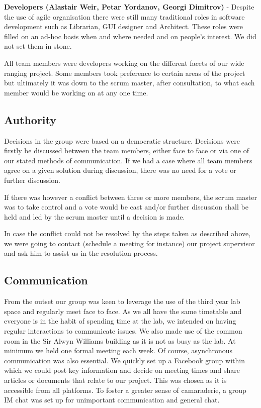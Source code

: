 \documentclass{l3proj}
\begin{document}
{\bf Developers (Alastair Weir, Petar Yordanov, Georgi Dimitrov)} - Despite the use of agile organisation there were still many traditional roles in software development such as Librarian, GUI designer and Architect.  These roles were filled on an ad-hoc basis when and where needed and on people’s interest. We did not set them in stone.

All team members were developers working on the different facets of our wide ranging project. Some members took preference to certain areas of the project but ultimately it was down to the scrum master, after consultation, to what each member would be working on at any one time.

\subsection{Authority}Decisions in the group were based on a democratic structure. Decisions were firstly be discussed between the team members, either face to face or via one of our stated methods of communication. If we had a case where all team members agree on a given solution during discussion, there was no need for a vote or further discussion.

If there was however a conflict between three or more members, the scrum master was to take control and a vote would be cast and/or further discussion shall be held and led by the scrum master until a decision is made.

In case the conflict could not be resolved by the steps taken as described above, we were going to contact (schedule a meeting for instance) our project supervisor and ask him to assist us in the resolution process.

\subsection{Communication}From the outset our group was keen to leverage the use of the third year lab space and regularly meet face to face. As we all have the same timetable and everyone is in the habit of spending time at the lab, we intended on having regular interactions to communicate issues. We also made use of the common room in the Sir Alwyn Williams building as it is not as busy as the lab. At minimum we held one formal meeting each week. Of course, asynchronous communication was also essential. We quickly set up a Facebook group within which we could post key information and decide on meeting times and share articles or documents that relate to our project. This was chosen as it is accessible from all platforms. To foster a greater sense of camaraderie, a group IM chat was set up for unimportant communication and general chat.
\end{document}
